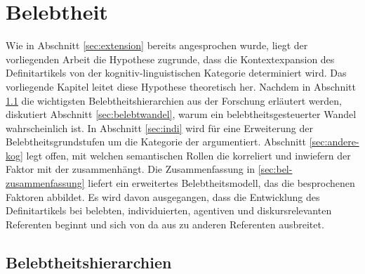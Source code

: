 \chapter{Belebtheit} \label{chapter:belebtheit}

Wie in Abschnitt \ref{sec:extension} bereits angesprochen wurde, liegt der vorliegenden Arbeit  die Hypothese zugrunde, dass die Kontextexpansion  des Definitartikels  von der kognitiv-linguistischen Kategorie  determiniert wird. Das vorliegende Kapitel leitet diese Hypothese theoretisch her. Nachdem in Abschnitt \ref{sec:belebt} die wichtigsten Belebtheitshierarchien  aus der Forschung erläutert werden, diskutiert Abschnitt \ref{sec:belebtwandel}, warum ein belebtheitsgesteuerter  Wandel wahrscheinlich ist. In Abschnitt \ref{sec:indi} wird für eine Erweiterung der Belebtheitsgrundstufen um die Kategorie der  argumentiert. Abschnitt \ref{sec:andere-kog} legt offen, mit welchen semantischen Rollen  die  korreliert und inwiefern der Faktor  mit der  zusammenhängt. Die Zusammenfassung in \ref{sec:bel-zusammenfassung} liefert ein erweitertes Belebtheitsmodell, das die besprochenen Faktoren abbildet. Es wird davon ausgegangen, dass die Entwicklung des Definitartikels  bei  belebten,  individuierten,  agentiven und diskursrelevanten Referenten beginnt und sich von da aus zu anderen Referenten ausbreitet. 

\section{Belebtheitshierarchien}\label{sec:belebt}

